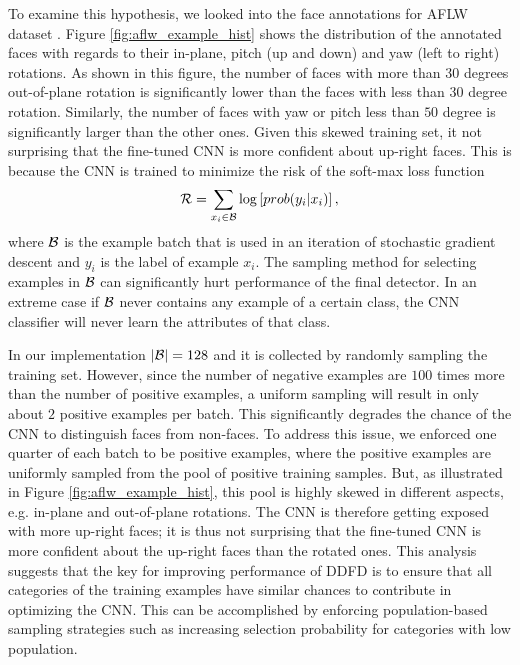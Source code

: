 \documentclass{sig-alternate-2013}
\begin{document}
To examine this hypothesis, we looked into the face annotations for AFLW dataset \cite{AFLW}. Figure \ref{fig:aflw_example_hist} shows the distribution of the annotated faces with regards to their in-plane, pitch (up and down) and yaw (left to right) rotations. As shown in this figure, the number of faces with more than $30$ degrees out-of-plane rotation is significantly lower than the faces with less than $30$ degree rotation. Similarly, the number of faces with yaw or pitch less than $50$ degree is significantly larger than the other ones. Given this skewed training set, it not surprising that the fine-tuned CNN is more confident about up-right faces. This is because the CNN is trained to minimize the risk of the soft-max loss function
\begin{equation}{\cal R} = \sum_{x_i \in {\cal B}} \log\left[prob(y_i| x_i )\right],
\end{equation}
where ${\cal B}$ is the example batch that is used in an iteration of stochastic gradient descent and  $y_i$ is the label of example $x_i$. The sampling method for selecting examples in ${\cal B}$ can significantly hurt performance of the final detector. In an extreme case if ${\cal B}$ never contains any example of a certain class, the CNN classifier will never learn the attributes of that class.

In our implementation $|{\cal B}| = 128$ and it is collected by randomly sampling the training set. However, since the number of negative examples are $100$ times more than the number of positive examples, a uniform sampling will result in only about $2$ positive examples per batch. This significantly degrades the chance of the CNN to distinguish faces from non-faces. To address this issue, we enforced one quarter of each batch to be positive examples, where the positive examples are uniformly sampled from the pool of positive training samples. But, as illustrated in Figure \ref{fig:aflw_example_hist}, this pool is highly skewed in different aspects, e.g. in-plane and out-of-plane rotations. The CNN is therefore getting exposed with more up-right faces; it is thus not surprising that the fine-tuned CNN is more confident about the up-right faces than the rotated ones. This analysis suggests that the key for improving performance of DDFD is to ensure that all categories of the training examples have similar chances to contribute in optimizing the CNN. This can be accomplished by enforcing population-based sampling strategies such as increasing selection probability for categories with low population.
\end{document}
